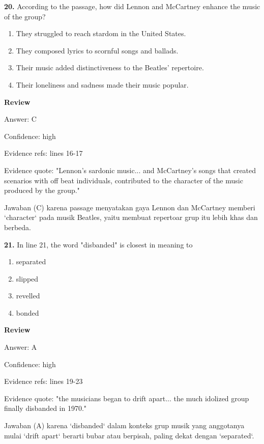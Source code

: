 \documentclass[12pt]{article}
\begin{document}
\endgroup
\par
\vspace{0.25\baselineskip}
\noindent\textbf{20.} According to the passage, how did Lennon and McCartney enhance the music of the group?
\begin{enumerate}[label=(\Alph*),leftmargin=*,itemsep=0.2em]
\item They struggled to reach stardom in the United States.
\item They composed lyrics to scornful songs and ballads.
\item Their music added distinctiveness to the Beatles' repertoire.
\item Their loneliness and sadness made their music popular.
\end{enumerate}
\par
\begingroup
\setlength{\parskip}{0pt}
\setlength{\parindent}{0pt}
\textbf{Review}\par
Answer: C\par
Confidence: high\par
Evidence refs: lines 16-17\par
Evidence quote: "Lennon's sardonic music... and McCartney's songs that created scenarios with off beat individuals, contributed to the character of the music produced by the group."\par
Jawaban (C) karena passage menyatakan gaya Lennon dan McCartney memberi `character` pada musik Beatles, yaitu membuat repertoar grup itu lebih khas dan berbeda.\par
\endgroup
\par
\vspace{0.25\baselineskip}
\noindent\textbf{21.} In line 21, the word "disbanded" is closest in meaning to
\begin{enumerate}[label=(\Alph*),leftmargin=*,itemsep=0.2em]
\item separated
\item slipped
\item revelled
\item bonded
\end{enumerate}
\par
\begingroup
\setlength{\parskip}{0pt}
\setlength{\parindent}{0pt}
\textbf{Review}\par
Answer: A\par
Confidence: high\par
Evidence refs: lines 19-23\par
Evidence quote: "the musicians began to drift apart... the much idolized group finally disbanded in 1970."\par
Jawaban (A) karena `disbanded` dalam konteks grup musik yang anggotanya mulai `drift apart` berarti bubar atau berpisah, paling dekat dengan `separated`.\par
\endgroup
\par
\vspace{0.25\baselineskip}
\end{document}
